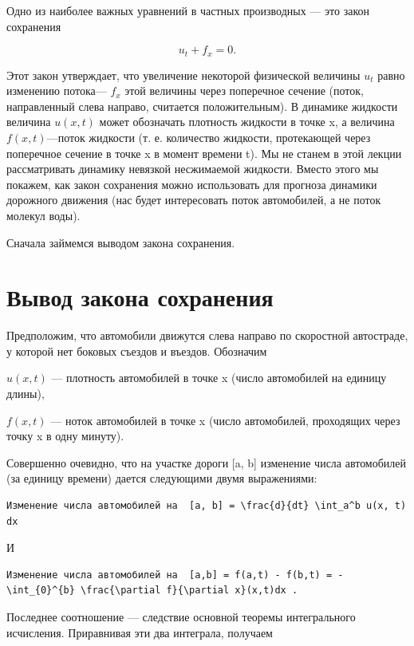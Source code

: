 \documentclass[
  ukrainian,
]{article}
\begin{document}
Одно из наиболее важных уравнений в частных производных --- это закон
сохранения

\[
u_t + f_x = 0.
\]

Этот закон утверждает, что увеличение некоторой физической величины
\(u_t\) равно изменению потока--- \(f_x\) этой величины через поперечное
сечение (поток, направленный слева направо, считается положительным). В
динамике жидкости величина \(u(x,t)\) может обозначать плотность
жидкости в точке x, а величина \(f(x,t)\)---поток жидкости (т. е.
количество жидкости, протекающей через поперечное сечение в точке x в
момент времени t). Мы не станем в этой лекции рассматривать динамику
невязкой несжимаемой жидкости. Вместо этого мы покажем, как закон
сохранения можно использовать для прогноза динамики дорожного движения
(нас будет интересовать поток автомобилей, а не поток молекул воды).

Сначала займемся выводом закона сохранения.

\section{Вывод закона
сохранения}\label{ux432ux44bux432ux43eux434-ux437ux430ux43aux43eux43dux430-ux441ux43eux445ux440ux430ux43dux435ux43dux438ux44f}

Предположим, что автомобили движутся слева направо по скоростной
автостраде, у которой нет боковых съездов и въездов. Обозначим

\(u(x, t)\) --- плотность автомобилей в точке x (число автомобилей на
единицу длины),

\(f(x, t)\) --- ноток автомобилей в точке x (число автомобилей,
проходящих через точку x в одну минуту).

Совершенно очевидно, что на участке дороги {[}a, b{]} изменение числа
автомобилей (за единицу времени) дается следующими двумя выражениями:

\begin{verbatim}
Изменение числа автомобилей на  [a, b] = \frac{d}{dt} \int_a^b u(x, t) dx
\end{verbatim}

И

\begin{verbatim}
Изменение числа автомобилей на  [a,b] = f(a,t) - f(b,t) = -\int_{0}^{b} \frac{\partial f}{\partial x}(x,t)dx .
\end{verbatim}

Последнее соотношение --- следствие основной теоремы интегрального
исчисления. Приравнивая эти два интеграла, получаем
\end{document}
